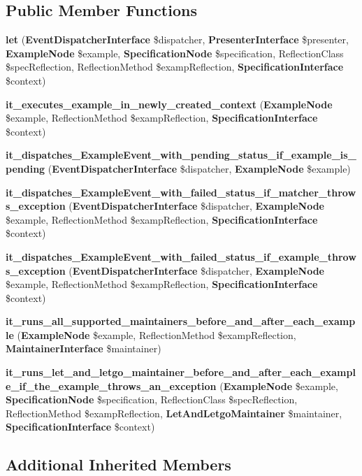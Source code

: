\subsection*{Public Member Functions}
\begin{DoxyCompactItemize}
\item 
{\bf let} ({\bf Event\+Dispatcher\+Interface} \$dispatcher, {\bf Presenter\+Interface} \$presenter, {\bf Example\+Node} \$example, {\bf Specification\+Node} \$specification, Reflection\+Class \$spec\+Reflection, Reflection\+Method \$examp\+Reflection, {\bf Specification\+Interface} \$context)
\item 
{\bf it\+\_\+executes\+\_\+example\+\_\+in\+\_\+newly\+\_\+created\+\_\+context} ({\bf Example\+Node} \$example, Reflection\+Method \$examp\+Reflection, {\bf Specification\+Interface} \$context)
\item 
{\bf it\+\_\+dispatches\+\_\+\+Example\+Event\+\_\+with\+\_\+pending\+\_\+status\+\_\+if\+\_\+example\+\_\+is\+\_\+pending} ({\bf Event\+Dispatcher\+Interface} \$dispatcher, {\bf Example\+Node} \$example)
\item 
{\bf it\+\_\+dispatches\+\_\+\+Example\+Event\+\_\+with\+\_\+failed\+\_\+status\+\_\+if\+\_\+matcher\+\_\+throws\+\_\+exception} ({\bf Event\+Dispatcher\+Interface} \$dispatcher, {\bf Example\+Node} \$example, Reflection\+Method \$examp\+Reflection, {\bf Specification\+Interface} \$context)
\item 
{\bf it\+\_\+dispatches\+\_\+\+Example\+Event\+\_\+with\+\_\+failed\+\_\+status\+\_\+if\+\_\+example\+\_\+throws\+\_\+exception} ({\bf Event\+Dispatcher\+Interface} \$dispatcher, {\bf Example\+Node} \$example, Reflection\+Method \$examp\+Reflection, {\bf Specification\+Interface} \$context)
\item 
{\bf it\+\_\+runs\+\_\+all\+\_\+supported\+\_\+maintainers\+\_\+before\+\_\+and\+\_\+after\+\_\+each\+\_\+example} ({\bf Example\+Node} \$example, Reflection\+Method \$examp\+Reflection, {\bf Maintainer\+Interface} \$maintainer)
\item 
{\bf it\+\_\+runs\+\_\+let\+\_\+and\+\_\+letgo\+\_\+maintainer\+\_\+before\+\_\+and\+\_\+after\+\_\+each\+\_\+example\+\_\+if\+\_\+the\+\_\+example\+\_\+throws\+\_\+an\+\_\+exception} ({\bf Example\+Node} \$example, {\bf Specification\+Node} \$specification, Reflection\+Class \$spec\+Reflection, Reflection\+Method \$examp\+Reflection, {\bf Let\+And\+Letgo\+Maintainer} \$maintainer, {\bf Specification\+Interface} \$context)
\end{DoxyCompactItemize}
\subsection*{Additional Inherited Members}


